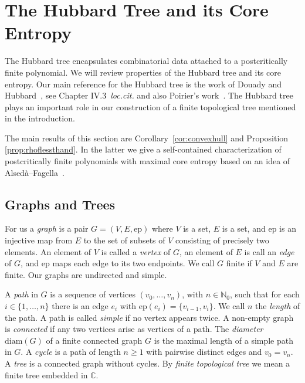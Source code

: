 \documentclass[12pt,oneside,a4]{amsart}
\newcommand{\IC}{\mathbb{C}}
\newcommand{\IN}{\mathbb{N}}
\numberwithin{maincounter}{section}
\numberwithin{equation}{section}
\newcommand{\ep}{\mathrm{ep}}
\begin{document}


\section{The Hubbard Tree and its Core Entropy}
\label{sec:trees}

The Hubbard tree encapsulates combinatorial data attached to a
postcritically finite polynomial.
We will review properties of  the Hubbard tree and its core entropy.
Our main reference for the Hubbard tree is the work of Douady and
Hubbard~\cite{DH:etudedynI}, see Chapter IV.3~\textit{loc.cit.} and also 
Poirier's work~\cite{poirier:hubbardtrees}.
The Hubbard tree plays an important role in our construction of a
finite topological tree mentioned in the introduction.

The main results of this section
are Corollary~\ref{cor:convexhull} and Proposition \ref{prop:rhoflessthand}. In
the latter we give a self-contained characterization of postcritically
finite polynomials with maximal core entropy
based on an idea of Alsed\`a--Fagella~\cite{AlsedaFagella}.

\subsection{Graphs and Trees}

For us a \textit{graph} is a pair
$G=(V,E,\ep)$ where $V$ is a set, $E$ is a set, and $\ep$ is an injective map
from $E$ to the set of subsets of $V$ consisting of precisely two
elements. An  element of $V$ is called a \textit{vertex} of $G$, an
element of $E$ is call an \textit{edge} of $G$, and $\ep$ maps each edge
to its two endpoints. We call $G$ finite if $V$ and $E$ are finite.
Our graphs are undirected and simple. 

A \textit{path} in $G$ is a sequence of vertices $(v_0,\ldots,v_n)$,
with $n\in\IN_0$, such that for each $i\in \{1,\ldots,n\}$ there is an
edge $e_i$ with $\ep(e_i) = \{v_{i-1},v_i\}$. We call $n$ the
\textit{length} of the path. A path is called \textit{simple} if no
vertex appears twice. A non-empty graph is \textit{connected} if
any two vertices arise as vertices of a path. The \textit{diameter}
$\mathrm{diam}(G)$ of a finite connected graph $G$ is the maximal
length of a simple path in $G$. A \textit{cycle} is a path of length
$n\ge 1$ with pairwise distinct edges and $v_0=v_n$. A \textit{tree}
is a connected graph without cycles. By \textit{finite topological tree}
we mean a finite tree embedded in $\IC$. 
\end{document}

